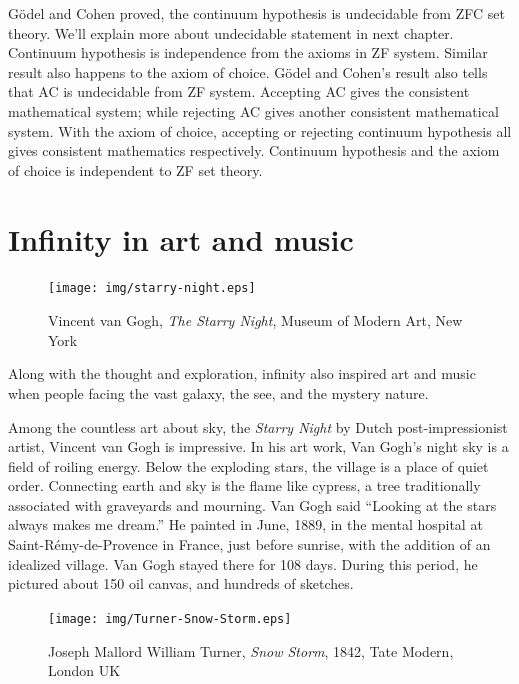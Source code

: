 \documentclass{article}
\begin{document}
Gödel and Cohen proved, the continuum hypothesis is undecidable from ZFC set theory. We'll explain more about undecidable statement in next chapter. Continuum hypothesis is independence from the axioms in ZF system. Similar result also happens to the axiom of choice. Gödel and Cohen's result also tells that AC is undecidable from ZF system. Accepting AC gives the consistent mathematical system; while rejecting AC gives another consistent mathematical system. With the axiom of choice, accepting or rejecting continuum hypothesis all gives consistent mathematics respectively. Continuum hypothesis and the axiom of choice is independent to ZF set theory\cite{GCH}.

\section{Infinity in art and music}

\begin{figure}[htbp]
 \centering
 \texttt{[image: img/starry-night.eps]}
 \captionsetup{labelformat=empty}
 \caption{Vincent van Gogh, {\em The Starry Night}, Museum of Modern Art, New York}
 \label{fig:starry-night}
\end{figure}

Along with the thought and exploration, infinity also inspired art and music when people facing the vast galaxy, the see, and the mystery nature.

Among the countless art about sky, the {\em Starry Night} by Dutch post-impressionist artist, Vincent van Gogh is impressive. In his art work, Van Gogh's night sky is a field of roiling energy. Below the exploding stars, the village is a place of quiet order. Connecting earth and sky is the flame like cypress, a tree traditionally associated with graveyards and mourning. Van Gogh said ``Looking at the stars always makes me dream.'' He painted in June, 1889, in the mental hospital at Saint-Rémy-de-Provence in France, just before sunrise, with the addition of an idealized village. Van Gogh stayed there for 108 days. During this period, he pictured about 150 oil canvas, and hundreds of sketches.

\begin{figure}[htbp]
 \centering
 \texttt{[image: img/Turner-Snow-Storm.eps]}
 \captionsetup{labelformat=empty}
 \caption{Joseph Mallord William Turner, {\em Snow Storm}, 1842, Tate Modern, London UK}
 \label{fig:Turner-Snow-Storm}
\end{figure}
\end{document}
